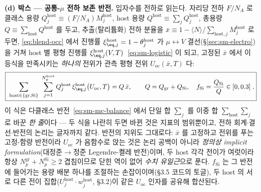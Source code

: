 \textbf{(d) 박스 --- 공통-$\mu$ 전하 보존 반전.} 입자수를 전하로 읽는다. 자리당 전하 $F/N_A$ 로 클래스
용량 $Q_j^\mathrm{host}\equiv(F/N_A)M_j^\mathrm{host}$, host 용량
$Q^\mathrm{host}\equiv\sum_jQ_j^\mathrm{host}$, 총용량 $Q\equiv\sum_\mathrm{host}Q^\mathrm{host}$ 를
두고, 추출(탈리튬화) 전하 분율을 $\bar x\equiv1-\langle N\rangle/\sum_{\mathrm{host},j}M_j^\mathrm{host}$
로 두면, \eqref{eq:blend-occ} 에서 진행률 $\xi_{\eq,j}^\mathrm{host}=1-\theta_j^\mathrm{host}$ 가
$\mu\leftrightarrow V$ 결선(\S\ref{sec:sm-electro})을 거쳐 host 별 평형 진행률
$\xi_{\eq,j}^\mathrm{host}(V,T)$~\eqref{eq:sm-logistic} 이 되고, 고정된 $\bar x$ 에서 이 등식을
만족시키는 \emph{하나의} 전위가 관측 평형 전위 $U_\mathrm{oc}(\bar x,T)$ 다:
\begin{equation}
\boxed{\;\sum_{\mathrm{host}\in\{\mathrm{gr},\mathrm{Si}\}}\ \sum_{j=1}^{N_p^\mathrm{host}}
Q_j^\mathrm{host}\,\xi_{\eq,j}^\mathrm{host}\bigl(U_\mathrm{oc},T\bigr)=Q\,\bar x,
\qquad
Q=Q_\mathrm{gr}+Q_\mathrm{Si},\quad f_\mathrm{Si}=\frac{Q_\mathrm{Si}}{Q}\in[0,0.3]\;.}
\label{eq:blend-balance}
\end{equation}
이 식은 다클래스 반전~\eqref{eq:sm-mc-balance} 에서 단일 합 $\sum_j$ 를 이중 합
$\sum_\mathrm{host}\sum_j$ 로 바꾼 \emph{한 줄}이다 --- 두 식을 나란히 두면 바뀐 것은 지표의 범위뿐이고,
전하 회계$\cdot$결선$\cdot$반전의 논리는 글자까지 같다. 반전의 지위도 그대로다: $\bar x$ 를 고정하고
전위를 푸는 고정-함량 반전이라 $U_\mathrm{oc}$ 가 음함수로 앉는 것은 논리 공백이 아니라 \emph{정의상
implicit formulation}(대정준$\to$정준 Legendre-켤레 반전)이며, 두 host 각각 전이가 여럿이라 항상
$N_p^\mathrm{gr}+N_p^\mathrm{Si}\ge2$ 겹침이므로 닫힌 역이 없어 \emph{수치 유일근}으로 푼다. $f_\mathrm{Si}$
는 그 반전에 들어가는 용량 배분 하나를 조절하는 손잡이이며(§3.5 코드의 토글), 두 host 의 서로 다른 전이
집합($U_j^\mathrm{host}\cdot w_j^\mathrm{host}$, §3.2)이 같은 $U_\mathrm{oc}$ 인자를 공유해 합산된다.

